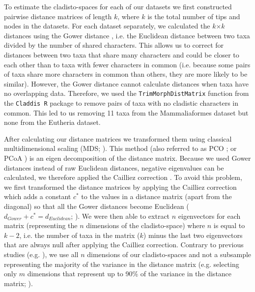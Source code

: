 \documentclass[12pt,letterpaper]{article}
\renewcommand{\subsubsection}[1]{%
\vspace{2ex}
\noindent
\textit{#1.}---}
\begin{document}
To estimate the cladisto-spaces for each of our datasets we first constructed pairwise distance matrices of length $k$, where $k$ is the total number of tips and nodes in the datasets.
For each dataset separately, we calculated the $k$$\times$$k$ distances using the Gower distance \cite{Gower71}, i.e. the Euclidean distance between two taxa divided by the number of shared characters. 
This allows us to correct for distances between two taxa that share many characters and could be closer to each other than to taxa with fewer characters in common (i.e. because some pairs of taxa share more characters in common than others, they are more likely to be similar).
However, the Gower distance cannot calculate distances when taxa have no overlapping data.
Therefore, we used the \texttt{TrimMorphDistMatrix} function from the \texttt{Claddis R} package \cite{Claddis} to remove pairs of taxa with no cladistic characters in common.
This led to us removing 11 taxa from the Mammaliaformes dataset but none from the Eutheria dataset.

After calculating our distance matrices we transformed them using classical multidimensional scaling (MDS; \cite{torgerson1965multidimensional,GOWER01121966,cailliez1983analytical}).
This method (also referred to as PCO \cite{Brusatte2015}; or PCoA \cite{paradisape:2004}) is an eigen decomposition of the distance matrix.
Because we used Gower distances instead of raw Euclidean distances, negative eigenvalues can be calculated, we therefore applied the Cailliez correction \cite{cailliez1983analytical}.
To avoid this problem, we first transformed the distance matrices by applying the Cailliez correction \cite{cailliez1983analytical} which adds a constant $c^*$ to the values in a distance matrix (apart from the diagonal) so that all the Gower distances become Euclidean ($d_{Gower}+c^*=d_{Euclidean}$; \cite{cailliez1983analytical}).
We were then able to extract $n$ eigenvectors for each matrix (representing the $n$ dimensions of the cladisto-space) where $n$ is equal to $k-2$, i.e. the number of taxa in the matrix ($k$) minus the last two eigenvectors that are always null after applying the Cailliez correction.
Contrary to previous studies (e.g. \cite{brusatte50,anderson2012using}), we use all $n$ dimensions of our cladisto-spaces and not a subsample representing the majority of the variance in the distance matrix (e.g. selecting only $m$ dimensions that represent up to 90\% of the variance in the distance matrix; \cite{Brusatte12092008,toljagictriassic-jurassic2013}).
\end{document}
